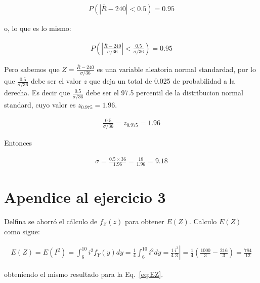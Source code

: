 \documentclass[10pt]{article}
\begin{document}
\begin{align*}
    P(|\bar{R}-240|<0.5)=0.95
\end{align*}

o, lo que es lo mismo:

\begin{align*}
    P\left(\left|\frac{\bar{R}-240}{\sigma/36}\right|<\frac{0.5}{\sigma/36}\right)=0.95
\end{align*}

Pero sabemos que $Z=\frac{\bar{R}-240}{\sigma/36}$ es una variable aleatoria normal
standardad, por lo que $\frac{0.5}{\sigma/36}$ debe ser el valor $z$ que deja
un total de 0.025 de probabilidad a la derecha. Es decir que
$\frac{0.5}{\sigma/36}$ debe ser el 97.5 percentil de la distribucion normal
standard, cuyo valor es $z_{0.975}=1.96$.

\begin{align*}
    \frac{0.5}{\sigma/36}=z_{0.975}=1.96
\end{align*}

Entonces

\begin{align*}
    \sigma=\frac{0.5\times 36}{1.96}=\frac{18}{1.96}=9.18
\end{align*}

\pagebreak
\section*{Apendice al ejercicio 3}

Delfina se ahorró el cálculo de $f_Z(z)$ para obtener $E(Z)$. Calculo $E(Z)$
como sigue:

\begin{align*}
    E(Z)=E(I^2)=\int_6^{10}i^2f_Y(y)dy=\frac{1}{4}\int_6^{10}i^2dy=\frac{1}{4}\left.\frac{i^3}{3}\right|=\frac{1}{4}\left(\frac{1000}{3}-\frac{216}{3}\right)=\frac{784}{12}
\end{align*}

obteniendo el mismo resultado para la Eq.~\ref{eq:EZ}.
\end{document}
